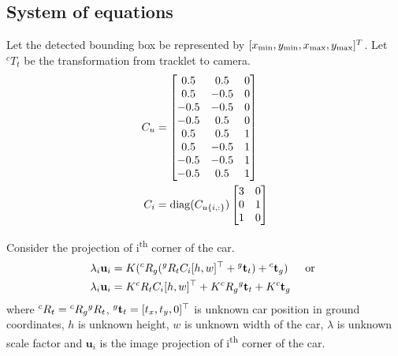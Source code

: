 \subsection{System of equations}
Let the detected bounding box be represented by $[x_{\text{min}}, y_{\text{min}}, x_{\text{max}}, y_{\text{max}}]^T$. Let $^cT_t$ be the transformation from tracklet to camera.
\newcommand{\Cu}{C_u}
\newcommand{\Cc}{C_c}
\begin{align}
  \Cu &= \begin{bmatrix}
    0.5 & 0.5 & 0\\
    0.5 & -0.5 & 0\\
    -0.5 & -0.5 & 0\\
    -0.5 & 0.5 & 0\\
    0.5 & 0.5 & 1\\
    0.5 & -0.5 & 1\\
    -0.5 & -0.5 & 1\\
    -0.5 & 0.5 & 1
  \end{bmatrix}\\
  C_i &= \diag( C_{u\{i,:\}} ) \begin{bmatrix}3& 0\\0 & 1 \\1 & 0\end{bmatrix} 
\end{align}

\newcommand{\ttg}{\Tr{g}{\mathbf{t}}{t}}
\newcommand{\tgc}{\Tr{c}{\mathbf{t}}{g}}
\newcommand{\Rgc}{\Tr{c}{R}{g}}
\newcommand{\Rtg}{\Tr{g}{R}{t}}
\newcommand{\Rtc}{\Tr{c}{R}{t}}
\newcommand{\Pgc}{\Tr{c}{P}{g}}
\newcommand{\Ptc}{\Tr{c}{P}{t}}

Consider the projection of i\textsuperscript{th} corner of the car.
\begin{align}
  \lambda_i \mathbf{u}_i &= K(\Rgc(\Rtg C_i[h, w]^\top + \ttg) + \tgc) & \text{ or }\\
  \lambda_i \mathbf{u}_i &= K\Rtc C_i [h, w]^\top + K\Rgc \ttg + K \tgc
  \label{eq:vectorproj}
\end{align}
where $\Rtc = \Rgc\Rtg$, $\ttg = [t_x, t_y, 0]^\top$ is unknown car position in
ground coordinates, $h$ is unknown height, $w$ is unknown width of the car,
$\lambda$ is unknown scale factor and $\mathbf{u}_i$ is the image projection of
i\textsuperscript{th} corner of the car.

